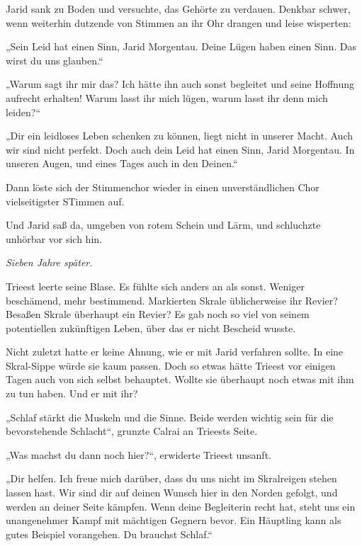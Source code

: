 Jarid sank zu Boden und versuchte, das Gehörte zu verdauen. Denkbar schwer, wenn weiterhin dutzende von Stimmen an ihr Ohr drangen und leise wisperten:

„Sein Leid hat einen Sinn, Jarid Morgentau. Deine Lügen haben einen Sinn. Das wirst du uns glauben.“

„Warum sagt ihr mir das? Ich hätte ihn auch sonst begleitet und seine Hoffnung aufrecht erhalten! Warum lasst ihr mich lügen, warum lasst ihr denn mich leiden?“

„Dir ein leidloses Leben schenken zu können, liegt nicht in unserer Macht. Auch wir sind nicht perfekt. Doch auch dein Leid hat einen Sinn, Jarid Morgentau. In unseren Augen, und eines Tages auch in den Deinen.“

Dann löste sich der Stimmenchor wieder in einen unverständlichen Chor vielseitigster STimmen auf.

Und Jarid saß da, umgeben von rotem Schein und Lärm, und schluchzte unhörbar vor sich hin.\bigskip








\textit{Sieben Jahre später.}\bigskip




Trieest leerte seine Blase. Es fühlte sich anders an als sonst. Weniger beschämend, mehr bestimmend. Markierten Skrale üblicherweise ihr Revier? Besaßen Skrale überhaupt ein Revier? Es gab noch so viel von seinem potentiellen zukünftigen Leben, über das er nicht Bescheid wusste.

Nicht zuletzt hatte er keine Ahnung, wie er mit Jarid verfahren sollte. In eine Skral-Sippe würde sie kaum passen. Doch so etwas hätte Trieest vor einigen Tagen auch von sich selbst behauptet. Wollte sie überhaupt noch etwas mit ihm zu tun haben. Und er mit ihr?

„Schlaf stärkt die Muskeln und die Sinne. Beide werden wichtig sein für die bevorstehende Schlacht“, grunzte Calrai an Trieests Seite.

„Was machst du dann noch hier?“, erwiderte Trieest unsanft.

„Dir helfen. Ich freue mich darüber, dass du uns nicht im Skralreigen stehen lassen hast. Wir sind dir auf deinen Wunsch hier in den Norden gefolgt, und werden an deiner Seite kämpfen. Wenn deine Begleiterin recht hat, steht uns ein unangenehmer Kampf mit mächtigen Gegnern bevor. Ein Häuptling kann als gutes Beispiel vorangehen. Du brauchst Schlaf.“

